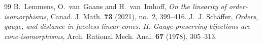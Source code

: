 \documentclass[10pt,a4paper]{amsart}
\begin{document}
\begin{thebibliography}{99}
 B.~Lemmens, O.~van~Gaans and H.~van~Imhoff, \textit{On the linearity of order-isomorphisms}, Canad. J. Math. \textbf{73} (2021), no.~2, 399--416.
 J.~J. Sch\"affer, \textit{Orders, gauge, and distance in faceless linear cones. II. Gauge-preserving bijections are cone-isomorphisms}, Arch. Rational Mech. Anal. \textbf{67} (1978), 305--313.
\end{thebibliography}
\end{document}
